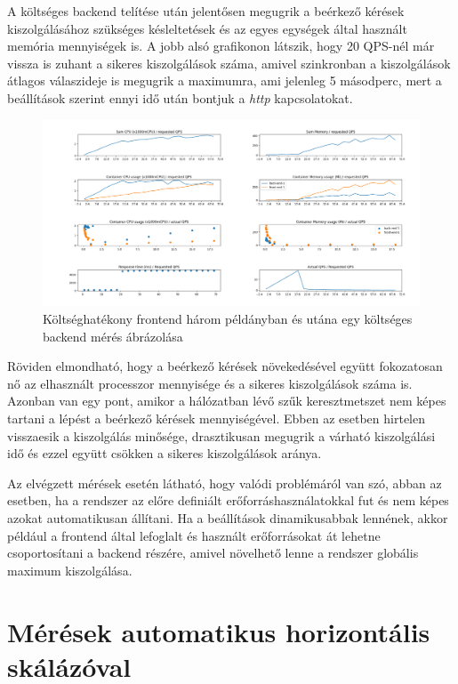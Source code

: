 A költséges backend telítése után jelentősen megugrik a beérkező kérések kiszolgálásához szükséges késleltetések és az egyes egységek által használt memória mennyiségek is.
A jobb alsó grafikonon látszik, hogy 20 QPS-nél már vissza is zuhant a sikeres kiszolgálások száma, amivel szinkronban a kiszolgálások átlagos válaszideje is megugrik a maximumra, ami jelenleg 5 másodperc, mert a beállítások szerint ennyi idő után bontjuk a \textit{http} kapcsolatokat.

\begin{figure}[!ht]
	\centering
	\includegraphics[width=150mm, keepaspectratio]{figures/multiFE-singleBE.png}
	\caption{Költséghatékony frontend három példányban és utána egy költséges backend mérés ábrázolása}
	\label{fig:3FE_stack_1BE}
\end{figure}

Röviden elmondható, hogy a beérkező kérések növekedésével együtt fokozatosan nő az elhasznált processzor mennyisége és a sikeres kiszolgálások száma is.
Azonban van egy pont, amikor a hálózatban lévő szűk keresztmetszet nem képes tartani a lépést a beérkező kérések mennyiségével. 
Ebben az esetben hirtelen visszaesik a kiszolgálás minősége, drasztikusan megugrik a várható kiszolgálási idő és ezzel együtt csökken a sikeres kiszolgálások aránya.

Az elvégzett mérések esetén látható, hogy valódi problémáról van szó, abban az esetben, ha a rendszer az előre definiált erőforráshasználatokkal fut és nem képes azokat automatikusan állítani.
Ha a beállítások dinamikusabbak lennének, akkor például a frontend által lefoglalt és használt erőforrásokat át lehetne csoportosítani a backend részére, amivel növelhető lenne a rendszer globális maximum kiszolgálása.

\section{Mérések automatikus horizontális skálázóval}

